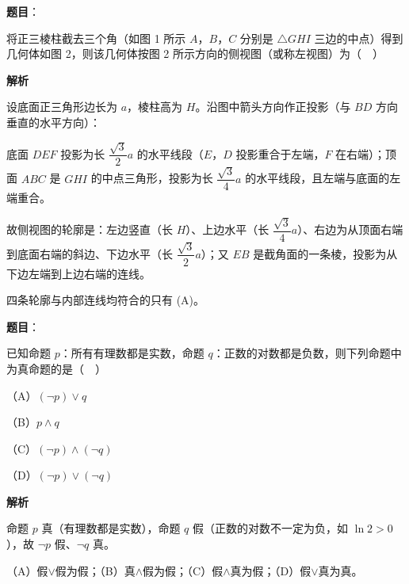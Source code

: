 \begin{answer}

\textbf{题目}：

将正三棱柱截去三个角（如图 1 所示 $A$，$B$，$C$ 分别是 $\triangle GHI$ 三边的中点）得到几何体如图 2，则该几何体按图 2 所示方向的侧视图（或称左视图）为（　）
\nopagebreak[4]
\begin{center}\end{center}
\nopagebreak[4]
\textbf{解析}

设底面正三角形边长为 $a$，棱柱高为 $H$。沿图中箭头方向作正投影（与 $BD$ 方向垂直的水平方向）：

底面 $DEF$ 投影为长 $\dfrac{\sqrt3}2a$ 的水平线段（$E$，$D$ 投影重合于左端，$F$ 在右端）；顶面 $ABC$ 是 $GHI$ 的中点三角形，投影为长 $\dfrac{\sqrt3}4a$ 的水平线段，且左端与底面的左端重合。

故侧视图的轮廓是：左边竖直（长 $H$）、上边水平（长 $\dfrac{\sqrt3}4a$）、右边为从顶面右端到底面右端的斜边、下边水平（长 $\dfrac{\sqrt3}2a$）；又 $EB$ 是截角面的一条棱，投影为从下边左端到上边右端的连线。

四条轮廓与内部连线均符合的只有 (A)。


\end{answer}
\begin{answer}

\textbf{题目}：

已知命题 $p$：所有有理数都是实数，命题 $q$：正数的对数都是负数，则下列命题中为真命题的是（　）

（A）$(\neg p)\vee q$

（B）$p\wedge q$

（C）$(\neg p)\wedge(\neg q)$

（D）$(\neg p)\vee(\neg q)$

\textbf{解析}

命题 $p$ 真（有理数都是实数），命题 $q$ 假（正数的对数不一定为负，如 $\ln2>0$），故 $\neg p$ 假、$\neg q$ 真。

（A）假$\vee$假为假；（B）真$\wedge$假为假；（C）假$\wedge$真为假；（D）假$\vee$真为真。


\end{answer}
